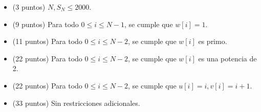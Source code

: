 \documentclass[12pt]{scrartcl}
\begin{document}


    \begin{itemize}
        \item (3 puntos) $N, S_N \le 2000$.
        \item (9 puntos) Para todo $0 \le i \le N - 1$, se cumple que $w[i] = 1$.
        \item (11 puntos) Para todo $0 \le i \le N - 2$, se cumple que $w[i]$ es primo.
        \item (22 puntos) Para todo $0 \le i \le N - 2$, se cumple que $w[i]$ es una potencia de 2.
        \item (22 puntos) Para todo $0 \le i \le N - 2$, se cumple que $u[i] = i, v[i] = i + 1$.
        \item (33 puntos) Sin restricciones adicionales.
    \end{itemize}
\end{document}
